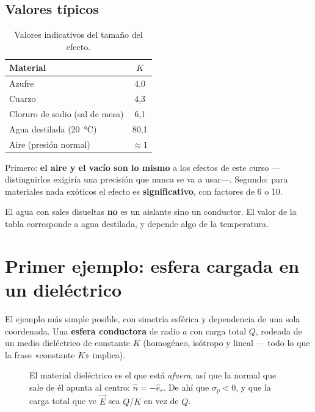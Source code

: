 \documentclass[12pt,a4paper]{article}
\begin{document}
\subsection{Valores típicos}

\begin{table}[H]
  \centering
  \begin{tabular}{lc}
    \toprule
    Material & $K$ \\
    \midrule
    Azufre                          & 4,0 \\
    Cuarzo                          & 4,3 \\
    Cloruro de sodio (sal de mesa)  & 6,1 \\
    Agua destilada (\SI{20}{\celsius}) & 80,1 \\
    Aire (presión normal)           & $\approx 1$ \\
    \bottomrule
  \end{tabular}
  \caption{Valores indicativos del tamaño del efecto.}
\end{table}

\begin{notebox}
Primero: \textbf{el aire y el vacío son lo mismo} a los efectos de este curso
---distinguirlos exigiría una precisión que nunca se va a usar---. Segundo: para
materiales nada exóticos el efecto es \textbf{significativo}, con factores de 6 o
10.
\end{notebox}

\begin{warnbox}
El agua con sales disueltas \textbf{no} es un aislante sino un conductor. El
valor de la tabla corresponde a agua destilada, y depende algo de la temperatura.
\end{warnbox}

\section{Primer ejemplo: esfera cargada en un dieléctrico}

El ejemplo más simple posible, con simetría esférica y dependencia de una sola
coordenada. Una \textbf{esfera conductora} de radio $a$ con carga total $Q$,
rodeada de un medio dieléctrico de constante $K$ (homogéneo, isótropo y lineal
--- todo lo que la frase «constante $K$» implica).

\begin{figure}[H]
  \centering
  
  \caption{El material dieléctrico es el que está \emph{afuera}, así que la
  normal que sale de él apunta al centro: $\hat n = -\hat e_r$. De ahí que
  $\sigma_p<0$, y que la carga total que ve $\vec E$ sea $Q/K$ en vez de $Q$.}
\end{figure}
\end{document}
